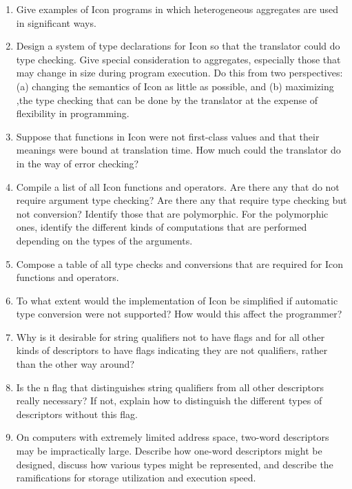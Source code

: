 \liststyleLiv
\begin{enumerate}

\item Give examples of Icon programs in which heterogeneous aggregates
are used in significant ways.

\item Design a system of type declarations for Icon so that the
translator could do type checking. Give special consideration to
aggregates, especially those that may change in size during program
execution. Do this from two perspectives: (a) changing the semantics
of Icon as little as possible, and (b) maximizing ,the type checking
that can be done by the translator at the expense of flexibility in
programming.

\item Suppose that functions in Icon were not first-class values and
that their meanings were bound at translation time. How much could the
translator do in the way of error checking?

\item Compile a list of all Icon functions and operators. Are there
any that do not require argument type checking? Are there any that
require type checking but not conversion? Identify those that are
polymorphic. For the polymorphic ones, identify the different kinds of
computations that are performed depending on the types of the
arguments.

\item Compose a table of all type checks and conversions that are
required for Icon functions and operators.

\item To what extent would the implementation of Icon be simplified if
automatic type conversion were not supported? How would this affect
the programmer?

\item Why is it desirable for string qualifiers not to have flags and
for all other kinds of descriptors to have flags indicating they are
not qualifiers, rather than the other way around?

\item Is the n flag that distinguishes string qualifiers from all
other descriptors really necessary? If not, explain how to distinguish
the different types of descriptors without this flag.

\item On computers with extremely limited address space, two-word
descriptors may be impractically large. Describe how one-word
descriptors might be designed, discuss how various types might be
represented, and describe the ramifications for storage utilization
and execution speed.


\end{enumerate}

